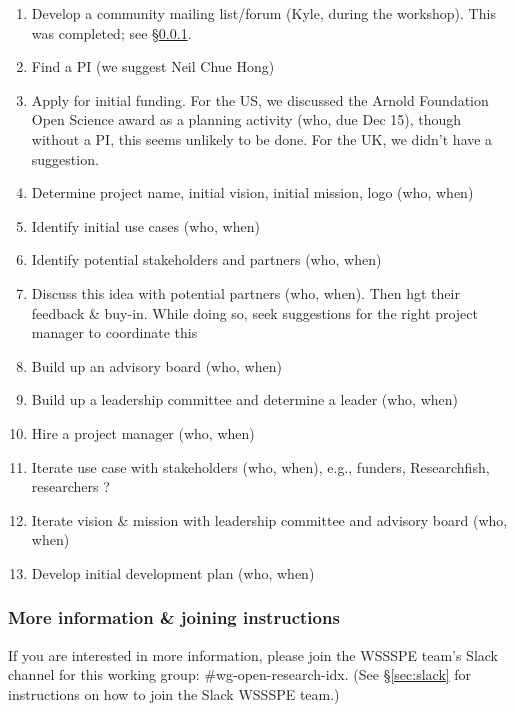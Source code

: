 \begin{enumerate}
\item Develop a community mailing list/forum (Kyle, during the workshop).  This was completed; see \S\ref{sec:wg-open-research-index-list}.

\item Find a PI (we suggest Neil Chue Hong)

\item Apply for initial funding. For the US, we discussed the Arnold Foundation Open Science award as a planning activity (who, due Dec 15), though without a PI, this seems unlikely to be done.
For the UK, we didn't have a suggestion.

\item Determine project name, initial vision, initial mission, logo (who, when)

\item Identify initial use cases (who, when)

\item Identify potential stakeholders and partners (who, when)

\item Discuss this idea with potential partners (who, when).
Then hgt their feedback \& buy-in.
While doing so, seek suggestions for the right project manager to coordinate this

\item Build up an advisory board (who, when)

\item Build up a leadership committee and determine a leader (who, when)

\item Hire a project manager (who, when)

\item Iterate use case with stakeholders (who, when),
e.g., funders, Researchfish, researchers ?

\item Iterate vision \& mission with leadership committee and advisory board (who, when)

\item Develop initial development plan (who, when)

\end{enumerate}


\subsubsection{More information \& joining instructions}\label{sec:wg-open-research-index-list}

If you are interested in more information, please join the WSSSPE team's Slack channel for this working group: \#wg-open-research-idx.  (See \S\ref{sec:slack} for instructions on how to join the Slack WSSSPE team.)
